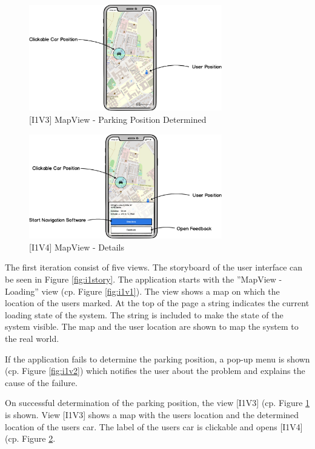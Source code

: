\begin{figure}[H]
    \centering
    \includegraphics[width=0.75\textwidth]{images/UI/[I1V3]MapView-ParkingPositonDetermined.png}
    \caption{[I1V3] MapView - Parking Position Determined}
    \label{fig:i1v3}
\end{figure}


\begin{figure}[H]
    \centering
    \includegraphics[width=0.75\textwidth]{images/UI/[I1V4]MapView-Details.png}
    \caption{[I1V4] MapView - Details}
    \label{fig:i1v4}
\end{figure}


The first iteration consist of five views. The storyboard of the user interface can be seen in Figure \ref{fig:i1story}. The application starts with the ''MapView - Loading'' view (cp. Figure \ref{fig:i1v1}). The view shows a map on which the location of the users marked. At the top of the page a string indicates the current loading state of the system. The string is included to make the state of the system visible. The map and the user location are shown to map the system to the real world. \cite{heurisitcNielsen}

If the application fails to determine the parking position, a pop-up menu is shown (cp. Figure \ref{fig:i1v2}) which notifies the user about the problem and explains the cause of the failure. 

On successful determination of the parking position, the view [I1V3] (cp. Figure \ref{fig:i1v3} is shown. View [I1V3] shows a map with the users location and the determined location of the users car. The label of the users car is clickable and opens [I1V4] (cp. Figure \ref{fig:i1v4}. 

